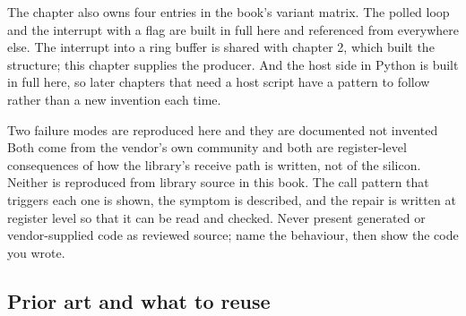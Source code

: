 The chapter also owns four entries in the book's variant matrix. The polled loop
and the interrupt with a flag are built in full here and referenced from
everywhere else. The interrupt into a ring buffer is shared with chapter 2,
which built the structure; this chapter supplies the producer. And the host side
in Python is built in full here, so later chapters that need a host script have
a pattern to follow rather than a new invention each time.

\begin{note}{Two failure modes are reproduced here and they are documented not invented}
Both come from the vendor's own community and both are register-level
consequences of how the library's receive path is written, not of the silicon.
Neither is reproduced from library source in this book. The call pattern that
triggers each one is shown, the symptom is described, and the repair is written
at register level so that it can be read and checked. Never present generated
or vendor-supplied code as reviewed source; name the behaviour, then show the
code you wrote.
\end{note}

\subsection*{Prior art and what to reuse}

